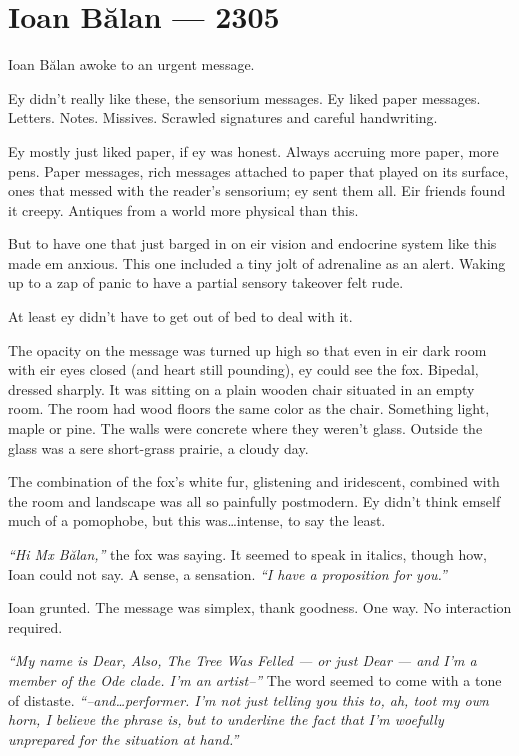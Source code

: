 \hypertarget{ioan-bux103lan-2305}{%
\chapter*{Ioan Bălan — 2305}\label{ioan-bux103lan-2305}}

Ioan Bălan awoke to an urgent message.

Ey didn't really like these, the sensorium messages. Ey liked paper messages. Letters. Notes. Missives. Scrawled signatures and careful handwriting.

Ey mostly just liked paper, if ey was honest. Always accruing more paper, more pens. Paper messages, rich messages attached to paper that played on its surface, ones that messed with the reader's sensorium; ey sent them all. Eir friends found it creepy. Antiques from a world more physical than this.

But to have one that just barged in on eir vision and endocrine system like this made em anxious. This one included a tiny jolt of adrenaline as an alert. Waking up to a zap of panic to have a partial sensory takeover felt rude.

At least ey didn't have to get out of bed to deal with it.

The opacity on the message was turned up high so that even in eir dark room with eir eyes closed (and heart still pounding), ey could see the fox. Bipedal, dressed sharply. It was sitting on a plain wooden chair situated in an empty room. The room had wood floors the same color as the chair. Something light, maple or pine. The walls were concrete where they weren't glass. Outside the glass was a sere short-grass prairie, a cloudy day.

The combination of the fox's white fur, glistening and iridescent, combined with the room and landscape was all so painfully postmodern. Ey didn't think emself much of a pomophobe, but this was\ldots{}intense, to say the least.

\emph{``Hi Mx Bălan,''} the fox was saying. It seemed to speak in italics, though how, Ioan could not say. A sense, a sensation. \emph{``I have a proposition for you.''}

Ioan grunted. The message was simplex, thank goodness. One way. No interaction required.

\emph{``My name is Dear, Also, The Tree Was Felled — or just Dear — and I'm a member of the Ode clade. I'm an artist--''} The word seemed to come with a tone of distaste. \emph{``--and\ldots{}performer. I'm not just telling you this to, ah, toot my own horn, I believe the phrase is, but to underline the fact that I'm woefully unprepared for the situation at hand.''}

